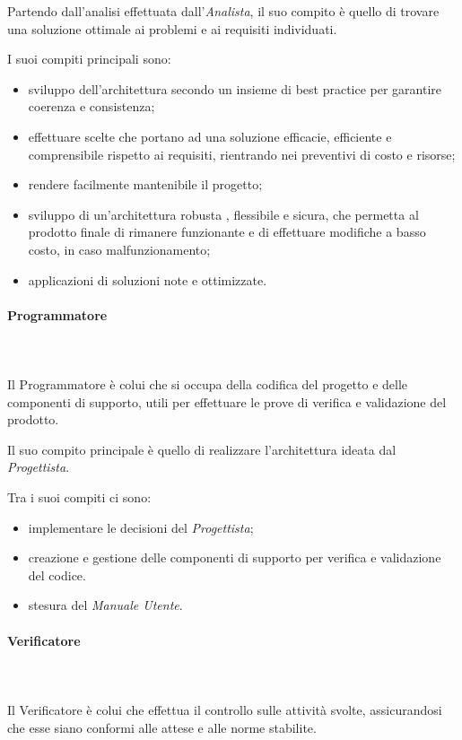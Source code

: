    			Partendo dall'analisi effettuata dall'\textit{Analista}, il suo compito è quello di trovare una soluzione ottimale ai problemi e ai requisiti individuati.

   			I suoi compiti principali sono:
   			\begin{itemize}
   				\item sviluppo dell'architettura secondo un insieme di best practice per garantire coerenza e consistenza;
   				\item effettuare scelte che portano ad una soluzione efficacie, efficiente e comprensibile rispetto ai requisiti, rientrando nei preventivi di costo e risorse;
   				\item rendere facilmente mantenibile il progetto;
   				\item sviluppo di un'architettura robusta , flessibile e sicura, che permetta al prodotto finale di rimanere funzionante e di effettuare modifiche a basso costo, in caso malfunzionamento;
   				\item applicazioni di soluzioni note e ottimizzate.
   			\end{itemize}
   			\paragraph{Programmatore} \mbox{}\\ \mbox{}\\
   			Il Programmatore è colui che si occupa della codifica del progetto e delle componenti di supporto, utili per effettuare le prove di verifica e validazione del prodotto.

   			Il suo compito principale è quello di realizzare l'architettura ideata dal \textit{Progettista}.

   			Tra i suoi compiti ci sono:
   			\begin{itemize}
   				\item implementare le decisioni del \textit{Progettista};
   				\item creazione e gestione delle componenti di supporto per verifica e validazione del codice.
   				\item stesura del \textit{Manuale Utente}.
   			\end{itemize}
   			\paragraph{Verificatore} \mbox{}\\ \mbox{}\\
   			Il Verificatore è colui che effettua il controllo sulle attività svolte, assicurandosi che esse siano conformi alle attese e alle norme stabilite.

